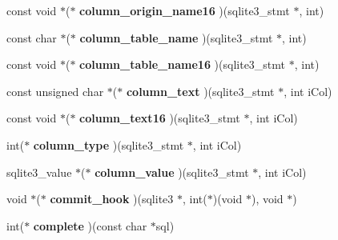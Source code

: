 \begin{DoxyCompactItemize}
const void $\ast$($\ast$ {\bfseries column\+\_\+origin\+\_\+name16} )(sqlite3\+\_\+stmt $\ast$, int)
\item 
\mbox{\label{structsqlite3__api__routines_a06525d1223f774274ff49b287d33a952}} 
const char $\ast$($\ast$ {\bfseries column\+\_\+table\+\_\+name} )(sqlite3\+\_\+stmt $\ast$, int)
\item 
\mbox{\label{structsqlite3__api__routines_a3252c82d0f2ed7e88a76f26585d13bbb}} 
const void $\ast$($\ast$ {\bfseries column\+\_\+table\+\_\+name16} )(sqlite3\+\_\+stmt $\ast$, int)
\item 
\mbox{\label{structsqlite3__api__routines_ae9bb95b6e37236693ca5ec51598c7908}} 
const unsigned char $\ast$($\ast$ {\bfseries column\+\_\+text} )(sqlite3\+\_\+stmt $\ast$, int i\+Col)
\item 
\mbox{\label{structsqlite3__api__routines_a952f4680bde7ff3af3ada148380ec08e}} 
const void $\ast$($\ast$ {\bfseries column\+\_\+text16} )(sqlite3\+\_\+stmt $\ast$, int i\+Col)
\item 
\mbox{\label{structsqlite3__api__routines_a1381e48828398ae738aa2416d2e4feb9}} 
int($\ast$ {\bfseries column\+\_\+type} )(sqlite3\+\_\+stmt $\ast$, int i\+Col)
\item 
\mbox{\label{structsqlite3__api__routines_a1ca935310e3637179f857791ccb42116}} 
sqlite3\+\_\+value $\ast$($\ast$ {\bfseries column\+\_\+value} )(sqlite3\+\_\+stmt $\ast$, int i\+Col)
\item 
\mbox{\label{structsqlite3__api__routines_a906bf080c41a7b3379866e08fe9f3db8}} 
void $\ast$($\ast$ {\bfseries commit\+\_\+hook} )(sqlite3 $\ast$, int($\ast$)(void $\ast$), void $\ast$)
\item 
\mbox{\label{structsqlite3__api__routines_acf6be6ede31fda32f4f0193aafce0ba3}} 
int($\ast$ {\bfseries complete} )(const char $\ast$sql)
\item 
\mbox{\label{structsqlite3__api__routines_a12b69b88bc84fba6fe97cefa4b979eff}} 

\end{DoxyCompactItemize}
